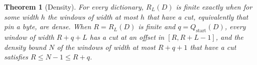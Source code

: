 \documentclass[11pt,a4paper]{article}
\theoremstyle{definition}
\theoremstyle{plain}
\newtheorem{theorem}{Theorem}
\newcommand{\ripple}{R_{L}}
\begin{document}

\begin{theorem}[Density]\label{thm:density}
For every dictionary, \(\ripple(D)\) is finite exactly when for some width \(h\) the windows of width at most \(h\) that
have a cut, equivalently that pin a byte, are dense. When \(R = \ripple(D)\) is finite and
\(q = Q_{\mathrm{start}}(D)\), every window of width \(R + q + L\) has a cut at an offset in \([R, R + L - 1]\), and the
density bound \(N\) of the windows of width at most \(R + q + 1\) that have a cut satisfies \(R \le N - 1 \le R + q\).
\end{theorem}
\end{document}
